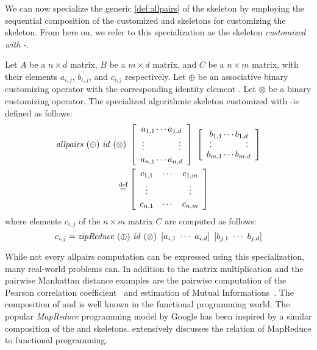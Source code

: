 We can now specialize the generic \autoref{def:allpairs} of the \allpairs skeleton by employing the sequential composition of the customized \reduce and \zip skeletons for customizing the \allpairs skeleton.
From here on, we refer to this specialization as the \allpairs skeleton \emph{customized with \zip-\reduce}.

\begin{definition}
  \label{def:allpairs:specialized}
  Let $A$ be a $n\times d$ matrix, $B$ be a $m\times d$ matrix, and $C$ be a $n\times m$ matrix, with their elements $a_{i,j}$, $b_{i,j}$, and $c_{i,j}$ respectively.
  Let $\oplus$ be an associative binary customizing operator with the corresponding identity element \id.
  Let $\otimes$ be a binary customizing operator.
  The specialized algorithmic skeleton \allpairs customized with \zip-\reduce is defined as follows:
  \begin{equation*}
    \begin{split}
      \allpairs\ (\oplus)\ \id\ (&\otimes)\ %
      \left[ \begin{array}{c} a_{1,1} \cdots a_{1,d}\\[.25em] \vdots \hspace{4em} \vdots\\[.25em] a_{n,1} \cdots a_{n,d} \end{array}\right]\ %
      \left[ \begin{array}{c} b_{1,1} \cdots b_{1,d}\\[-.25em] \cdot \hspace{4em} \cdot\\[-.75em] \cdot \hspace{4em} \cdot\\[-.25em] b_{m,1} \cdots b_{m,d} \end{array}\right]%
      \\
    &\eqdef \left[ \begin{array}{ccc} c_{1,1} & \cdots & c_{1,m}\\[.25em] \vdots & & \vdots\\[.25em] c_{n,1} & \cdots & c_{n,m} \end{array} \right]
    \end{split}
  \end{equation*}
  where elements $c_{i,j}$ of the $n\times m$ matrix $C$ are computed as follows:
  \[
    c_{i,j} = \text{\textit{zipReduce}}\ (\oplus)\ \text{\textit{id}}\ (\otimes)\ \left[a_{i,1}\ \cdots\ a_{i,d}\right]\ \left[b_{j,1}\ \cdots\ b_{j,d}\right]
  \]
\end{definition}


While not every allpairs computation can be expressed using this specialization, many real-world problems can.
In addition to the matrix multiplication and the pairwise Manhattan distance examples are the pairwise computation of the Pearson correlation coefficient~\cite{ChangDeQuRo2009} and estimation of Mutual Informations~\cite{DaubStSeKl2004}.
The composition of \zip and \reduce is well known in the functional programming world.
The popular \emph{MapReduce} programming model by Google has been inspired by a similar composition of the \map and \reduce skeletons.
\cite{Laemmel2007} extensively discusses the relation of MapReduce to functional programming.



